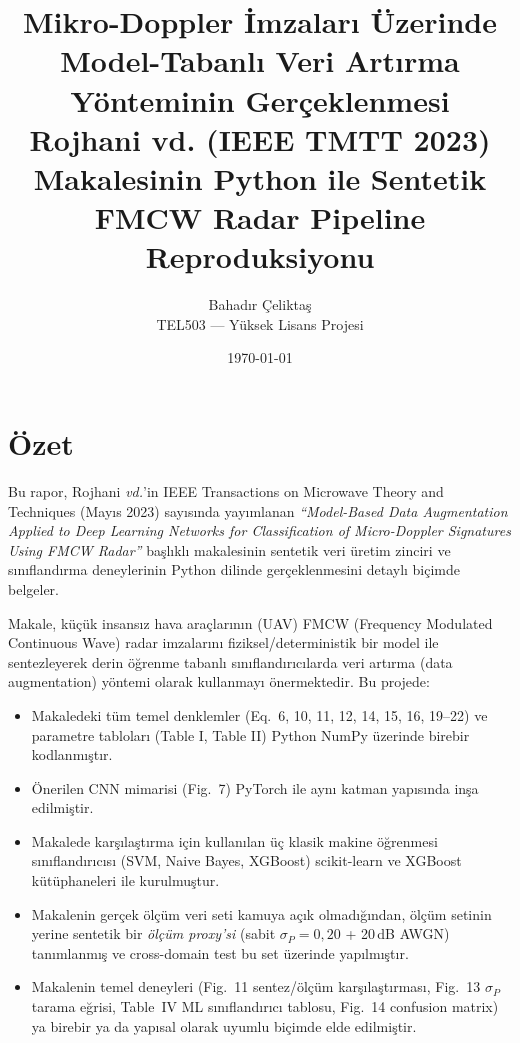 \documentclass[11pt,a4paper]{article}
\title{\textbf{Mikro-Doppler İmzaları Üzerinde Model-Tabanlı Veri Artırma Yönteminin Gerçeklenmesi}\\[0.5em]
\large Rojhani vd. (IEEE TMTT 2023) Makalesinin Python ile Sentetik FMCW Radar Pipeline Reproduksiyonu}
\author{Bahadır Çeliktaş\\
TEL503 — Yüksek Lisans Projesi}
\date{\today}
\begin{document}
\maketitle
\tableofcontents
\newpage

\section{Özet}
Bu rapor, Rojhani \emph{vd.}'in IEEE Transactions on Microwave Theory and Techniques (Mayıs 2023) sayısında yayımlanan
\emph{``Model-Based Data Augmentation Applied to Deep Learning Networks for Classification of Micro-Doppler Signatures Using FMCW Radar''}
başlıklı makalesinin sentetik veri üretim zinciri ve sınıflandırma deneylerinin Python dilinde gerçeklenmesini detaylı biçimde belgeler.

Makale, küçük insansız hava araçlarının (UAV) FMCW (Frequency Modulated Continuous Wave) radar
imzalarını fiziksel/deterministik bir model ile sentezleyerek derin öğrenme tabanlı sınıflandırıcılarda
veri artırma (data augmentation) yöntemi olarak kullanmayı önermektedir. Bu projede:
\begin{itemize}
    \item Makaledeki tüm temel denklemler (Eq.~6, 10, 11, 12, 14, 15, 16, 19--22) ve
          parametre tabloları (Table I, Table II) Python NumPy üzerinde birebir kodlanmıştır.
    \item Önerilen CNN mimarisi (Fig.~7) PyTorch ile aynı katman yapısında inşa edilmiştir.
    \item Makalede karşılaştırma için kullanılan üç klasik makine öğrenmesi sınıflandırıcısı
          (SVM, Naive Bayes, XGBoost) scikit-learn ve XGBoost kütüphaneleri ile kurulmuştur.
    \item Makalenin gerçek ölçüm veri seti kamuya açık olmadığından,
          ölçüm setinin yerine sentetik bir \emph{ölçüm proxy'si} (sabit $\sigma_P=0{,}20$ + 20\,dB AWGN)
          tanımlanmış ve cross-domain test bu set üzerinde yapılmıştır.
    \item Makalenin temel deneyleri (Fig.~11 sentez/ölçüm karşılaştırması, Fig.~13 $\sigma_P$ tarama eğrisi,
          Table~IV ML sınıflandırıcı tablosu, Fig.~14 confusion matrix) ya birebir ya da yapısal olarak
          uyumlu biçimde elde edilmiştir.
\end{itemize}

\end{document}
